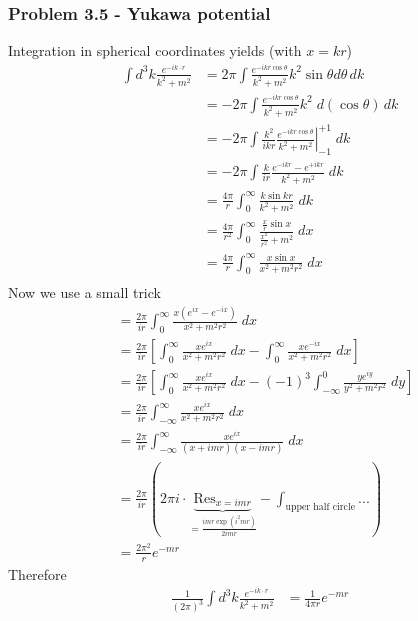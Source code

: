 \documentclass[10pt,a4paper]{book}
\theoremstyle{definition}
\begin{document}
\subsubsection{Problem 3.5 - Yukawa potential}
Integration in spherical coordinates yields (with $x=kr$)
\begin{align}
    \int d^3k\frac{e^{-ik\cdot r}}{k^2+m^2}
    &=2\pi\int  \frac{e^{-ikr\cos{\theta}}}{k^2+m^2} k^2\sin\theta d\theta\, dk\\
    &=-2\pi\int \frac{e^{-ikr\cos{\theta}}}{k^2+m^2} k^2 \; d(\cos\theta)\, dk\\
    &=-2\pi\int \left.\frac{k^2}{ikr}\frac{e^{-ikr\cos{\theta}}}{k^2+m^2} \right|_{-1}^{+1} \; dk\\
    &=-2\pi\int \frac{k}{ir}\frac{e^{-ikr}-e^{+ikr}}{k^2+m^2}  \; dk\\
    &=\frac{4\pi}{r}\int_0^\infty  \frac{k\sin{kr}}{k^2+m^2}  \; dk\\
    &=\frac{4\pi}{r^2}\int_0^\infty  \frac{\frac{x}{r}\sin{x}}{\frac{x^2}{r^2}+m^2}  \; dx\\
    &=\frac{4\pi}{r}\int_0^\infty  \frac{x\sin{x}}{x^2+m^2r^2}  \; dx\\
\end{align}
Now we use a small trick
\begin{align}
    &=\frac{2\pi}{ir}\int_0^\infty  \frac{x(e^{ix}-e^{-ix})}{x^2+m^2r^2}  \; dx\\
    &=\frac{2\pi}{ir}\left[\int_0^\infty\frac{xe^{ix}}{x^2+m^2r^2}  \; dx - \int_0^\infty\frac{xe^{-ix}}{x^2+m^2r^2}  \; dx\right]\\
    &=\frac{2\pi}{ir}\left[\int_0^\infty\frac{xe^{ix}}{x^2+m^2r^2}  \; dx - (-1)^3 \int_{-\infty}^0\frac{ye^{iy}}{y^2+m^2r^2}  \; dy\right]\\
    &=\frac{2\pi}{ir}\int_{-\infty}^\infty\frac{xe^{ix}}{x^2+m^2r^2}  \; dx \\
    &=\frac{2\pi}{ir}\int_{-\infty}^\infty\frac{xe^{ix}}{(x+imr)(x-imr)}  \; dx \\
    &= \frac{2\pi}{ir}\left(2\pi i\cdot \underbrace{\text{Res}_{x=imr}}_{=\frac{imr\exp(i^2mr)}{2imr}}-\int_\text{upper half circle}...\right)\\
    &= \frac{2\pi^2}{r} e^{-mr}
\end{align}
Therefore
\begin{align}
    \frac{1}{(2\pi)^3}\int d^3k\frac{e^{-ik\cdot r}}{k^2+m^2}
    &= \frac{1}{4\pi r} e^{-mr}
\end{align}
\end{document}
